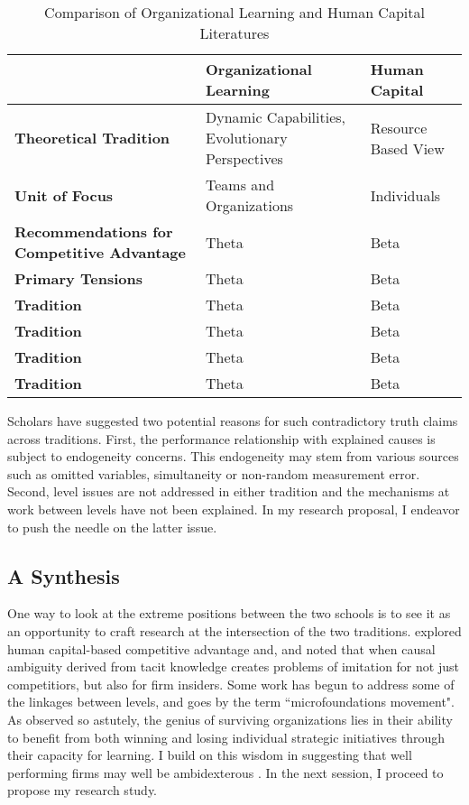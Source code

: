 \documentclass[12pt,letterpaper]{article}
\begin{document}
\begin{table}
\begin{centering}
\caption {Comparison of Organizational Learning and Human Capital Literatures}
\label{qe2a}
{\tabulinesep=1.4mm
\begin{tabu}{|p{0.25\textwidth}|p{0.35\textwidth}|p{0.35\textwidth}|}
\hline
& \textbf{Organizational Learning} & \textbf{Human Capital}  \\
\hline   
\textbf{Theoretical Tradition}& Dynamic Capabilities, Evolutionary Perspectives & Resource Based View  \\\hline
\textbf{Unit of Focus}& Teams and Organizations & Individuals  \\\hline
\textbf{Recommendations for Competitive Advantage}& Theta & Beta  \\\hline
\textbf{Primary Tensions}& Theta & Beta  \\\hline
\textbf{Tradition}& Theta & Beta  \\\hline
\textbf{Tradition}& Theta & Beta  \\\hline
\textbf{Tradition}& Theta & Beta  \\\hline
\textbf{Tradition}& Theta & Beta  \\\hline 
\end{tabu}}
\end{centering}
\end{table} 

Scholars have suggested two potential reasons for such contradictory truth claims across traditions. First, the performance relationship with explained causes is subject to endogeneity concerns. This endogeneity may stem from various sources such as omitted variables, simultaneity or non-random measurement error. Second, level issues are not addressed in either tradition and the mechanisms at work between levels have not been explained. In my research proposal, I endeavor to push the needle on the latter issue.

\subsection{A Synthesis}
One way to look at the extreme positions between the two schools is to see it as an opportunity to craft research at the intersection of the two traditions. \cite{Coff2011} explored human capital-based competitive advantage and, and noted that when causal ambiguity derived from tacit knowledge creates problems of imitation for not just competitiors, but also for firm insiders. Some work \citep{Coff2011, Ployhart2011} has begun to address some of the linkages between levels, and goes by the term ``microfoundations movement". As \cite{Burgelman1991} observed so astutely, the genius of surviving organizations lies in their ability to benefit from both winning and losing individual strategic initiatives through their capacity for learning. I build on this wisdom in suggesting that well performing firms may well be ambidexterous \citep{OReilly2004, OReilly2008}. In the next session, I proceed to propose my research study.
\end{document}
